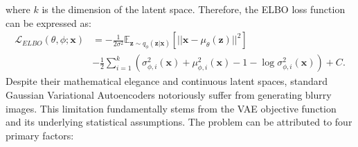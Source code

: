 where $k$ is the dimension of the latent space. Therefore, the ELBO loss function can be expressed as:
\begin{align}
    \mathcal{L}_{ELBO}(\theta, \phi; \mathbf{x}) &= -\frac{1}{2\sigma^2} \mathbb{E}_{\mathbf{z}\sim q_{\phi}(\mathbf{z}|\mathbf{x})} \left[||\mathbf{x} - \mu_{\theta}(\mathbf{z})||^2\right] \\ 
    &- \frac{1}{2} \sum_{i=1}^k \left( \sigma^2_{\phi,i}(\mathbf{x}) + \mu^2_{\phi,i}(\mathbf{x}) - 1 - \log \sigma^2_{\phi,i}(\mathbf{x}) \right) + C.
\end{align} 
Despite their mathematical elegance and continuous latent spaces, standard Gaussian Variational Autoencoders notoriously suffer from generating blurry images. 
This limitation fundamentally stems from the VAE objective function and its underlying statistical assumptions. The problem can be attributed to four primary factors:
